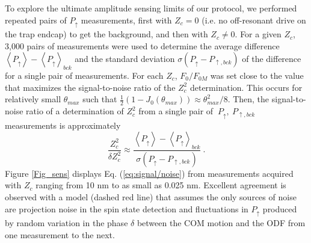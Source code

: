\documentclass[aps,prl,twocolumn,superscriptaddress,floatfix]{revtex4-1}
\begin{document}
To explore the ultimate amplitude sensing limits of our protocol, we performed repeated pairs of $P_{\uparrow}$ measurements,
first with $Z_c = 0$ (i.e. no off-resonant drive on the trap endcap)
to get the background, and then with \mbox{$Z_{c}\neq0$}. For a given $Z_{c}$,
3,000 pairs of measurements were used to determine the average difference $\left\langle P_{\uparrow}\right\rangle -\left\langle P_{\uparrow}\right\rangle _{bck}$
and the standard deviation $\sigma\left( P_{\uparrow} - P_{\uparrow ,bck} \right)$
of the difference for a single pair of measurements. For each $Z_c$, $F_{0}/F_{0M}$ was set close to the value that maximizes the signal-to-noise ratio of
the $Z_{c}^{2}$ determination. This occurs for relatively small
$\theta_{max}$ such that \mbox{$\frac{1}{2}\left(1-J_{0}\left(\theta_{max}\right)\right)\approx\theta_{max}^{2}/8$}. Then, the signal-to-noise ratio of a determination of $Z_{c}^{2}$ from a single pair of $\ P_{\uparrow},\: P_{\uparrow, bck}$ measurements is approximately 
\begin{equation}
\frac{Z_{c}^{2}}{\delta Z_{c}^{2}}\approx\frac{\left\langle P_{\uparrow}\right\rangle -\left\langle P_{\uparrow}\right\rangle  _{bck}}{\sigma\left( P_{\uparrow} - P_{\uparrow , bck} \right)}\:.\label{eq:signal/noise}
\end{equation}
Figure \ref{Fig_sens} displays Eq. (\ref{eq:signal/noise}) from measurements acquired with $Z_{c}$
ranging from 10 nm to as small as 0.025 nm. Excellent agreement is
observed with a model (dashed red line) that assumes the only sources
of noise are projection noise in the spin state detection and fluctuations
in $P_{\uparrow}$ produced by random variation in the phase $\delta$ between the COM motion and the ODF from one measurement to the next.
\end{document}
